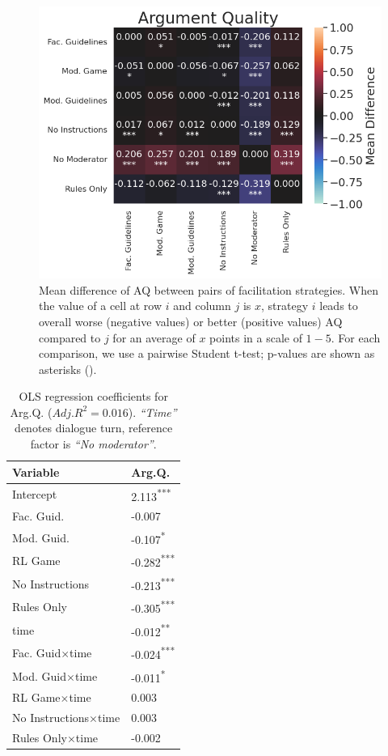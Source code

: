 \begin{figure}[t]
    \includegraphics[width=\linewidth]{resources/argumentq_stats.png}
	\centering
	\caption{Mean difference of \ac{AQ} between pairs of facilitation strategies. When the value of a cell at row $i$ and column $j$ is $x$, strategy $i$ leads to overall worse (negative values) or better (positive values) \ac{AQ} compared to $j$ for an average of $x$ points in a scale of $1-5$. For each comparison, we use a pairwise Student t-test; p-values are shown as asterisks (\asterisknote).}
	\label{fig:aq_stats}
\end{figure}

\begin{table}[t]
\centering
    \begin{tabular}{l p{3cm}}
        \toprule
        \textbf{Variable} & \textbf{Arg.Q.} \\
        \midrule
        Intercept & 2.113\textsuperscript{***} \\
        Fac. Guid. & -0.007 \\
        Mod. Guid. & -0.107\textsuperscript{*} \\
        RL Game & -0.282\textsuperscript{***} \\
        No Instructions & -0.213\textsuperscript{***} \\
        Rules Only & -0.305\textsuperscript{***} \\
        time & -0.012\textsuperscript{**} \\
        Fac. Guid$\times$time & -0.024\textsuperscript{***} \\
        Mod. Guid$\times$time & -0.011\textsuperscript{*} \\
        RL Game$\times$time & 0.003 \\
        No Instructions$\times$time & 0.003 \\
        Rules Only$\times$time & -0.002 \\
        \bottomrule
    \end{tabular}
    \small
    \asterisknote
    \normalsize
    \caption{\ac{OLS} regression coefficients for Arg.Q. ($Adj. R^2=0.016$). \textit{“Time”} denotes dialogue turn, reference factor is \textit{“No moderator”}.}
    \label{tab:argq}
\end{table}

